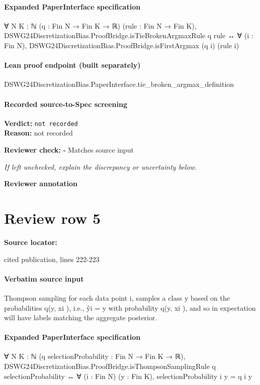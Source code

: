 \documentclass[10pt]{article}
\newcommand{\reviewerbox}{%
  \par\noindent\fbox{\parbox{0.96\linewidth}{\rule{0pt}{0.38in}}}\par
}
\newcommand{\reviewmatch}[1]{%
  \par\noindent\textbf{Reviewer check:} $\square$\; #1\par
  \noindent\emph{If left unchecked, explain the discrepancy or uncertainty below.}\par
}
\begin{document}
\paragraph{Expanded PaperInterface specification}
\begin{ReviewVerbatim}
∀ {N K : ℕ} (q : Fin N → Fin K → ℝ) (rule : Fin N → Fin K),
  DSWG24DiscretizationBias.ProofBridge.isTieBrokenArgmaxRule q rule ↔
    ∀ (i : Fin N), DSWG24DiscretizationBias.ProofBridge.isFirstArgmax (q i) (rule i)
\end{ReviewVerbatim}

\paragraph{Lean proof endpoint (built separately)}\begin{ReviewVerbatim}
DSWG24DiscretizationBias.PaperInterface.tie_broken_argmax_definition
\end{ReviewVerbatim}

\paragraph{Recorded source-to-Spec screening}
\textbf{Verdict:} \texttt{not recorded}
\\
\textbf{Reason:} not recorded
\reviewmatch{Matches source input}
\noindent\textbf{Reviewer annotation}\par
\reviewerbox
\clearpage
\hypertarget{source-claim-4bfc3aed59b0dc06}{}
\section*{Review row 5}
\textbf{Source locator:} {\footnotesize\raggedright cited publication, lines 222-\allowbreak{}223\par}
\paragraph{Verbatim source input}
\begin{ReviewVerbatim}
Thompson sampling for each data point i, samples a class y based on the probabilities q(y, xi ), i.e., ŷi = y
    with probability q(y, xi ), and so in expectation will have labels matching the aggregate posterior.
\end{ReviewVerbatim}


\paragraph{Expanded PaperInterface specification}
\begin{ReviewVerbatim}
∀ {N K : ℕ} (q selectionProbability : Fin N → Fin K → ℝ),
  DSWG24DiscretizationBias.ProofBridge.isThompsonSamplingRule q selectionProbability ↔
    ∀ (i : Fin N) (y : Fin K), selectionProbability i y = q i y
\end{ReviewVerbatim}
\end{document}

